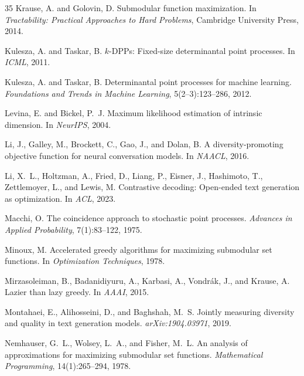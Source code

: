 \documentclass[11pt]{article}
\begin{document}
\begin{thebibliography}{35}
Krause, A. and Golovin, D.
\newblock Submodular function maximization.
\newblock In \emph{Tractability: Practical Approaches to Hard Problems},
  Cambridge University Press, 2014.

Kulesza, A. and Taskar, B.
\newblock $k$-{DPP}s: Fixed-size determinantal point processes.
\newblock In \emph{ICML}, 2011.

Kulesza, A. and Taskar, B.
\newblock Determinantal point processes for machine learning.
\newblock \emph{Foundations and Trends in Machine Learning}, 5(2--3):123--286, 2012.

Levina, E. and Bickel, P.~J.
\newblock Maximum likelihood estimation of intrinsic dimension.
\newblock In \emph{NeurIPS}, 2004.

Li, J., Galley, M., Brockett, C., Gao, J., and Dolan, B.
\newblock A diversity-promoting objective function for neural conversation
  models.
\newblock In \emph{NAACL}, 2016.

Li, X.~L., Holtzman, A., Fried, D., Liang, P., Eisner, J., Hashimoto, T.,
  Zettlemoyer, L., and Lewis, M.
\newblock Contrastive decoding: Open-ended text generation as optimization.
\newblock In \emph{ACL}, 2023.

Macchi, O.
\newblock The coincidence approach to stochastic point processes.
\newblock \emph{Advances in Applied Probability}, 7(1):83--122, 1975.

Minoux, M.
\newblock Accelerated greedy algorithms for maximizing submodular set functions.
\newblock In \emph{Optimization Techniques}, 1978.

Mirzasoleiman, B., Badanidiyuru, A., Karbasi, A., Vondr{\'a}k, J., and
  Krause, A.
\newblock Lazier than lazy greedy.
\newblock In \emph{AAAI}, 2015.

Montahaei, E., Alihosseini, D., and Baghshah, M.~S.
\newblock Jointly measuring diversity and quality in text generation models.
\newblock \emph{arXiv:1904.03971}, 2019.

Nemhauser, G.~L., Wolsey, L.~A., and Fisher, M.~L.
\newblock An analysis of approximations for maximizing submodular set functions.
\newblock \emph{Mathematical Programming}, 14(1):265--294, 1978.


\end{thebibliography}
\end{document}
